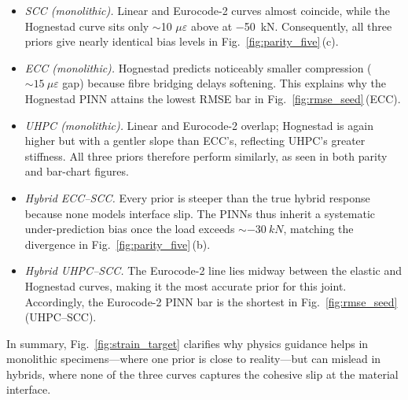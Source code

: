 \documentclass{article}
\begin{document}
\begin{itemize}
  \item \emph{SCC (monolithic).}
        Linear and Eurocode-2 curves almost coincide, while the
        Hognestad curve sits only \(\sim\)10 \(\mu\varepsilon\) above at
        \SI{-50}{kN}.  Consequently, all three priors give nearly
        identical bias levels in Fig.~\ref{fig:parity_five}\,(c).

  \item \emph{ECC (monolithic).}
        Hognestad predicts noticeably smaller compression
        (\(\sim\!15~\mu\varepsilon\) gap) because fibre bridging delays
        softening.  This explains why the Hognestad
        PINN attains the lowest RMSE bar in
        Fig.~\ref{fig:rmse_seed}\,(ECC).

  \item \emph{UHPC (monolithic).}
        Linear and Eurocode-2 overlap; Hognestad is again higher but
        with a gentler slope than ECC’s, reflecting UHPC’s greater
        stiffness.  All three priors therefore perform similarly, as
        seen in both parity and bar-chart figures.

  \item \emph{Hybrid ECC–SCC.}
        Every prior is steeper than the true hybrid response because
        none models interface slip.  The PINNs thus inherit a systematic
        under-prediction bias once the load exceeds \(\sim\SI{-30}{kN}\),
        matching the divergence in Fig.~\ref{fig:parity_five}\,(b).

  \item \emph{Hybrid UHPC–SCC.}
        The Eurocode-2 line lies midway between the elastic and
        Hognestad curves, making it the most accurate prior for this
        joint.  Accordingly, the Eurocode-2 PINN bar is the shortest in
        Fig.~\ref{fig:rmse_seed}\,(UHPC–SCC).
\end{itemize}

In summary, Fig.~\ref{fig:strain_target} clarifies why physics guidance
helps in monolithic specimens—where one prior is close to reality—but
can mislead in hybrids, where none of the three curves captures the
cohesive slip at the material interface.


\end{document}
